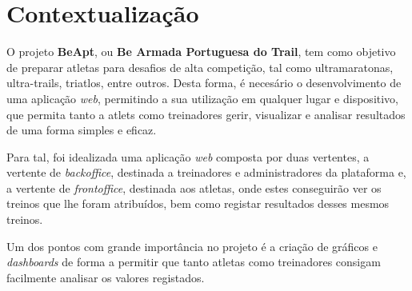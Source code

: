 \section{Contextualização}

O projeto \textbf{BeApt}, ou \textbf{Be Armada Portuguesa do Trail}, tem como objetivo de preparar atletas para desafios de alta competição, tal como ultramaratonas, ultra-trails, triatlos, entre outros. Desta forma, é necesário o desenvolvimento de uma aplicação \textit{web}, permitindo a sua utilização em qualquer lugar e dispositivo, que permita tanto a atlets como treinadores gerir, visualizar e analisar resultados de uma forma simples e eficaz.

Para tal, foi idealizada uma aplicação \textit{web} composta por duas vertentes, a vertente de \textit{backoffice}, destinada a treinadores e administradores da plataforma e, a vertente de \textit{frontoffice}, destinada aos atletas, onde estes conseguirão ver os treinos que lhe foram atribuídos, bem como registar resultados desses mesmos treinos.

Um dos pontos com grande importância no projeto é a criação de gráficos e \textit{dashboards} de forma a permitir que tanto atletas como treinadores consigam facilmente analisar os valores registados.